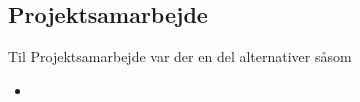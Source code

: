 \subsection{Projektsamarbejde}

Til Projektsamarbejde var der en del alternativer såsom

\begin{itemize}
    \item   
\end{itemize}


